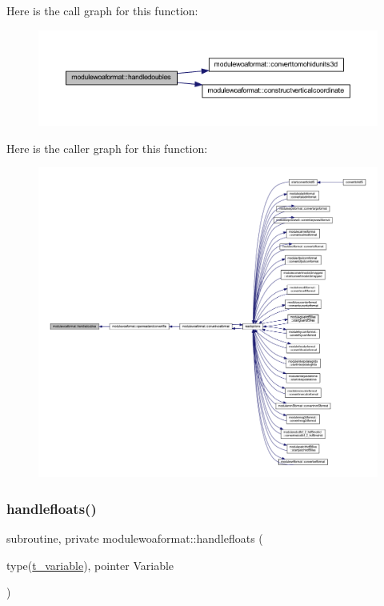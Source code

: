 Here is the call graph for this function\+:\nopagebreak
\begin{figure}[H]
\begin{center}
\leavevmode
\includegraphics[width=350pt]{namespacemodulewoaformat_ad8813b60f60898f593061c4a41c50e3f_cgraph}
\end{center}
\end{figure}
Here is the caller graph for this function\+:\nopagebreak
\begin{figure}[H]
\begin{center}
\leavevmode
\includegraphics[width=350pt]{namespacemodulewoaformat_ad8813b60f60898f593061c4a41c50e3f_icgraph}
\end{center}
\end{figure}
\mbox{\label{namespacemodulewoaformat_a6f71dbf9ea3807fb2646798269449c84}} 
\subsubsection{\texorpdfstring{handlefloats()}{handlefloats()}}
{\footnotesize\ttfamily subroutine, private modulewoaformat\+::handlefloats (\begin{DoxyParamCaption}\item[{type(\mbox{\hyperlink{structmodulewoaformat_1_1t__variable}{t\+\_\+variable}}), pointer}]{Variable }\end{DoxyParamCaption})\hspace{0.3cm}{\ttfamily [private]}}

